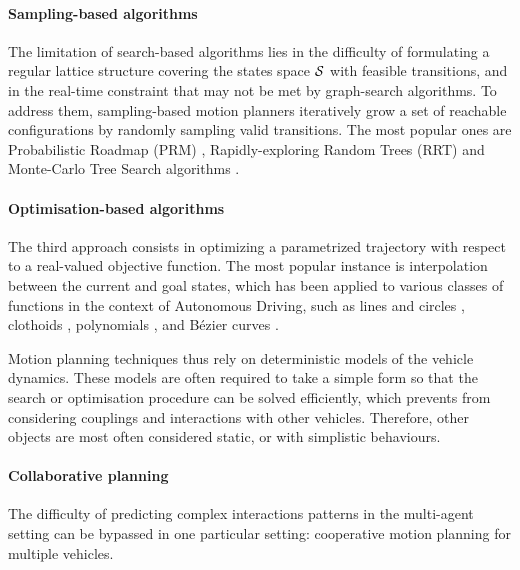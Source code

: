 \paragraph{Sampling-based algorithms}

The limitation of search-based algorithms lies in the difficulty of formulating a regular lattice structure covering the states space $\mathcal{S}$ with feasible transitions, and in the real-time constraint that may not be met by graph-search algorithms. To address them, sampling-based motion planners iteratively grow a set of reachable configurations by randomly sampling valid transitions. The most popular ones are Probabilistic Roadmap (PRM) \citep{Kavraki1996}, Rapidly-exploring Random Trees (RRT) \citep{Lavalle98,Karaman2011} and Monte-Carlo Tree Search algorithms \citep[e.g.][]{Kocsis2006}.

\paragraph{Optimisation-based algorithms}

The third approach consists in optimizing a parametrized trajectory with respect to a real-valued objective function. The most popular instance is interpolation between the current and goal states, which has been applied to various classes of functions in the context of Autonomous Driving, such as lines and circles \citep{Reeds1990}, clothoids \citep{Funke2012}, polynomials \citep{Xu2012}, and Bézier curves \citep{Gonzalez2016}.

Motion planning techniques thus rely on deterministic models of the vehicle dynamics. These models are often required to take a simple form so that the search or optimisation procedure can be solved efficiently, which prevents from considering couplings and interactions with other vehicles. Therefore, other objects are most often considered static, or with simplistic behaviours. 

\paragraph{Collaborative planning}

The difficulty of predicting complex interactions patterns in the multi-agent setting can be bypassed in one particular setting: cooperative motion planning for multiple vehicles.


